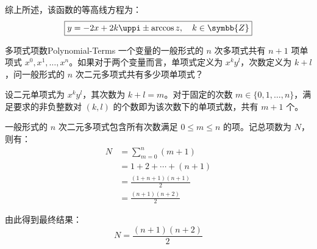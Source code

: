 \begin{solution}
    \begin{center}
    \end{center}
    综上所述，该函数的等高线方程为：
    \begin{equation*}
        \boxed{y = -2x + 2k\uppi \pm \arccos z, \quad k \in \symbb{Z}}
    \end{equation*}
\end{solution}


\begin{problem}{多项式项数}{Polynomial-Terms}
    一个变量的一般形式的 $n$ 次多项式共有 $n+1$ 项单项式 $x^0, x^1, \dots, x^n$。如果对于两个变量而言，单项式定义为 $x^k y^l$，次数定义为 $k+l$，问一般形式的 $n$ 次二元多项式共有多少项单项式？
\end{problem}

\begin{solution}
    设二元单项式为 $x^k y^l$，其次数为 $k+l = m$。对于固定的次数 $m \in \{0, 1, \dots, n\}$，满足要求的非负整数对 $(k, l)$ 的个数即为该次数下的单项式数，共有 $m+1$ 个。

    一般形式的 $n$ 次二元多项式包含所有次数满足 $0 \le m \le n$ 的项。记总项数为 $N$，则有：
    \begin{equation*}
        \begin{aligned}
            N & = \sum_{m=0}^{n} (m+1)         \\
              & = 1 + 2 + \cdots + (n+1)       \\
              & = \frac{(1 + n + 1)(n + 1)}{2} \\
              & = \frac{(n+1)(n+2)}{2}
        \end{aligned}
    \end{equation*}

    由此得到最终结果：
    \begin{equation*}
        \boxed{N = \frac{(n+1)(n+2)}{2}}
    \end{equation*}
\end{solution}


